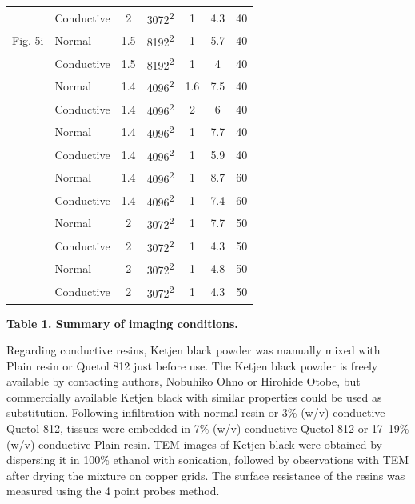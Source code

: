 \documentclass{article}
\begin{document}
\begin{center}
\begin{tabular}{llccccc}
 & Conductive & 2 & 3072\textsuperscript{2} & 1 & 4.3 & 40 \\
Fig. 5i & Normal & 1.5 & 8192\textsuperscript{2} & 1 & 5.7 & 40 \\
 & Conductive & 1.5 & 8192\textsuperscript{2} & 1 & 4 & 40 \\
 & Normal & 1.4 & 4096\textsuperscript{2} & 1.6 & 7.5 & 40 \\
 & Conductive & 1.4 & 4096\textsuperscript{2} & 2 & 6 & 40 \\
 & Normal & 1.4 & 4096\textsuperscript{2} & 1 & 7.7 & 40 \\
 & Conductive & 1.4 & 4096\textsuperscript{2} & 1 & 5.9 & 40 \\
 & Normal & 1.4 & 4096\textsuperscript{2} & 1 & 8.7 & 60 \\
 & Conductive & 1.4 & 4096\textsuperscript{2} & 1 & 7.4 & 60 \\
 & Normal & 2 & 3072\textsuperscript{2} & 1 & 7.7 & 50 \\
 & Conductive & 2 & 3072\textsuperscript{2} & 1 & 4.3 & 50 \\
 & Normal & 2 & 3072\textsuperscript{2} & 1 & 4.8 & 50 \\
 & Conductive & 2 & 3072\textsuperscript{2} & 1 & 4.3 & 50 \\
\bottomrule
\end{tabular}
\end{center}
\noindent\textbf{Table 1. Summary of imaging conditions.}

Regarding conductive resins, Ketjen black powder was manually mixed with Plain resin or Quetol 812 just before use. The Ketjen black powder is freely available by contacting authors, Nobuhiko Ohno or Hirohide Otobe, but commercially available Ketjen black with similar properties could be used as substitution. Following infiltration with normal resin or 3\% (w/v) conductive Quetol 812, tissues were embedded in 7\% (w/v) conductive Quetol 812 or 17–19\% (w/v) conductive Plain resin. TEM images of Ketjen black were obtained by dispersing it in 100\% ethanol with sonication, followed by observations with TEM after drying the mixture on copper grids. The surface resistance of the resins was measured using the 4 point probes method.
\end{document}
